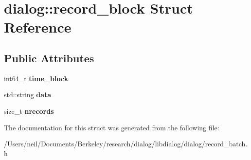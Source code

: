 \hypertarget{structdialog_1_1record__block}{}\section{dialog\+:\+:record\+\_\+block Struct Reference}
\label{structdialog_1_1record__block}
\subsection*{Public Attributes}
\begin{DoxyCompactItemize}
\item 
\mbox{\label{structdialog_1_1record__block_a455e5d4b183709b019249312e6962df7}} 
int64\+\_\+t {\bfseries time\+\_\+block}
\item 
\mbox{\label{structdialog_1_1record__block_a8e9d9fadaf0ef3fc55a26f3e439d4db1}} 
std\+::string {\bfseries data}
\item 
\mbox{\label{structdialog_1_1record__block_a9496f8995310f46fd976d56995d2a0f7}} 
size\+\_\+t {\bfseries nrecords}
\end{DoxyCompactItemize}


The documentation for this struct was generated from the following file\+:\begin{DoxyCompactItemize}
\item 
/\+Users/neil/\+Documents/\+Berkeley/research/dialog/libdialog/dialog/record\+\_\+batch.\+h\end{DoxyCompactItemize}
